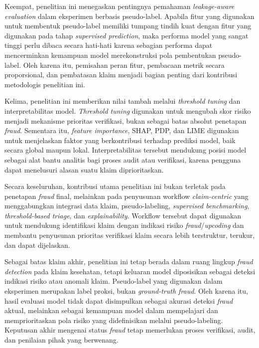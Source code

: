Keempat, penelitian ini menegaskan pentingnya pemahaman \emph{leakage-aware evaluation} dalam eksperimen berbasis pseudo-label. Apabila fitur yang digunakan untuk membentuk pseudo-label memiliki tumpang tindih kuat dengan fitur yang digunakan pada tahap \emph{supervised prediction}, maka performa model yang sangat tinggi perlu dibaca secara hati-hati karena sebagian performa dapat mencerminkan kemampuan model merekonstruksi pola pembentukan pseudo-label. Oleh karena itu, pemisahan peran fitur, pembacaan metrik secara proporsional, dan pembatasan klaim menjadi bagian penting dari kontribusi metodologis penelitian ini.

Kelima, penelitian ini memberikan nilai tambah melalui \emph{threshold tuning} dan interpretabilitas model. \emph{Threshold tuning} digunakan untuk mengubah skor risiko menjadi mekanisme prioritas verifikasi, bukan sebagai batas absolut penetapan \emph{fraud}. Sementara itu, \emph{feature importance}, SHAP, PDP, dan LIME digunakan untuk menjelaskan faktor yang berkontribusi terhadap prediksi model, baik secara global maupun lokal. Interpretabilitas tersebut mendukung posisi model sebagai alat bantu analitis bagi proses audit atau verifikasi, karena pengguna dapat menelusuri alasan suatu klaim diprioritaskan.

Secara keseluruhan, kontribusi utama penelitian ini bukan terletak pada penetapan \emph{fraud} final, melainkan pada penyusunan workflow \emph{claim-centric} yang menggabungkan integrasi data klaim, pseudo-labeling, \emph{supervised benchmarking}, \emph{threshold-based triage}, dan \emph{explainability}. Workflow tersebut dapat digunakan untuk mendukung identifikasi klaim dengan indikasi risiko \emph{fraud}/\emph{upcoding} dan membantu penyusunan prioritas verifikasi klaim secara lebih terstruktur, terukur, dan dapat dijelaskan.

Sebagai batas klaim akhir, penelitian ini tetap berada dalam ruang lingkup \emph{fraud detection} pada klaim kesehatan, tetapi keluaran model diposisikan sebagai deteksi indikasi risiko atau anomali klaim. Pseudo-label yang digunakan dalam eksperimen merupakan label proksi, bukan \emph{ground-truth fraud}. Oleh karena itu, hasil evaluasi model tidak dapat disimpulkan sebagai akurasi deteksi \emph{fraud} aktual, melainkan sebagai kemampuan model dalam mempelajari dan memprioritaskan pola risiko yang didefinisikan melalui pseudo-labeling. Keputusan akhir mengenai status \emph{fraud} tetap memerlukan proses verifikasi, audit, dan penilaian pihak yang berwenang.

